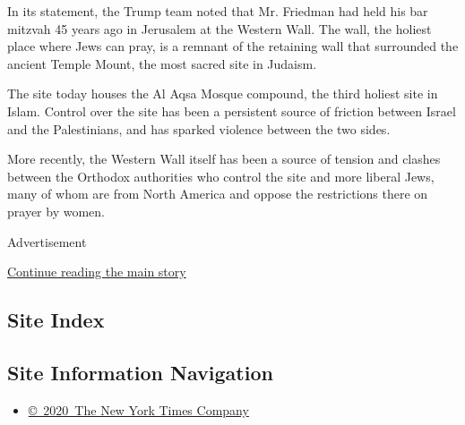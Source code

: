 In its statement, the Trump team noted that Mr. Friedman had held his
bar mitzvah 45 years ago in Jerusalem at the Western Wall. The wall, the
holiest place where Jews can pray, is a remnant of the retaining wall
that surrounded the ancient Temple Mount, the most sacred site in
Judaism.

The site today houses the Al Aqsa Mosque compound, the third holiest
site in Islam. Control over the site has been a persistent source of
friction between Israel and the Palestinians, and has sparked violence
between the two sides.

More recently, the Western Wall itself has been a source of tension and
clashes between the Orthodox authorities who control the site and more
liberal Jews, many of whom are from North America and oppose the
restrictions there on prayer by women.

Advertisement

\protect\hyperlink{after-bottom}{Continue reading the main story}

\hypertarget{site-index}{%
\subsection{Site Index}\label{site-index}}

\hypertarget{site-information-navigation}{%
\subsection{Site Information
Navigation}\label{site-information-navigation}}

\begin{itemize}
\tightlist
\item
  \href{https://help.nytimes3xbfgragh.onion/hc/en-us/articles/115014792127-Copyright-notice}{©~2020~The
  New York Times Company}
\end{itemize}

